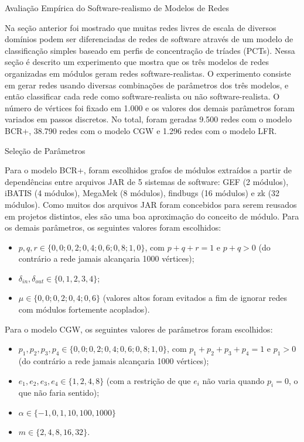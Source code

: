\begin{section}{Avaliação Empírica do Software-realismo de Modelos de Redes}

Na seção anterior foi mostrado que muitas redes livres de escala de diversos domínios podem ser diferenciadas de redes de software através de um modelo de classificação simples baseado em perfis de concentração de tríades (PCTs). Nessa seção é descrito um experimento que mostra que os três modelos de redes organizadas em módulos geram redes software-realistas. O experimento consiste em gerar redes usando diversas combinações de parâmetros dos três modelos, e então classificar cada rede como software-realista ou não software-realista. O número de vértices foi fixado em 1.000 e os valores dos demais parâmetros foram variados em passos discretos. No total, foram geradas 9.500 redes com o modelo BCR+, 38.790 redes com o modelo CGW e 1.296 redes com o modelo LFR.

\begin{subsection}{Seleção de Parâmetros} \label{sec:parametros}

Para o modelo BCR+, foram escolhidos grafos de módulos extraídos a partir de dependências entre arquivos JAR de 5 sistemas de software: GEF (2 módulos), iBATIS (4 módulos), MegaMek (8 módulos), findbugs (16 módulos) e zk (32 módulos). Como muitos dos arquivos JAR foram concebidos para serem reusados em projetos distintos, eles são uma boa aproximação do conceito de módulo. Para os demais parâmetros, os seguintes valores foram escolhidos:

\begin{itemize}
	\item $p, q, r \in \{0,0; 0,2; 0,4; 0,6; 0,8; 1,0\}$, com $p + q + r = 1$ e $p + q > 0$ (do contrário a rede jamais alcançaria 1000 vértices);
	\item $\delta_{in}, \delta_{out} \in \{0, 1, 2, 3, 4\}$;
	\item $\mu \in \{0,0; 0,2; 0,4; 0,6\}$ (valores altos foram evitados a fim de ignorar redes com módulos fortemente acoplados).
\end{itemize}

Para o modelo CGW, os seguintes valores de parâmetros foram escolhidos:

\begin{itemize}
	\item $p_1, p_2, p_3, p_4 \in \{0,0; 0,2; 0,4; 0,6; 0,8; 1,0\}$, com $p_1 + p_2 + p_3 + p_4 = 1$ e $p_1 > 0$ (do contrário a rede jamais alcançaria 1000 vértices);
	\item $e_1, e_2, e_3, e_4 \in \{1, 2, 4, 8\}$ (com a restrição de que $e_i$ não varia quando $p_i = 0$, o que não faria sentido);
	\item $\alpha \in \{-1, 0, 1, 10, 100, 1000\}$
	\item $m \in \{2, 4, 8, 16, 32\}$.
\end{itemize}


\end{subsection}
\end{section}
